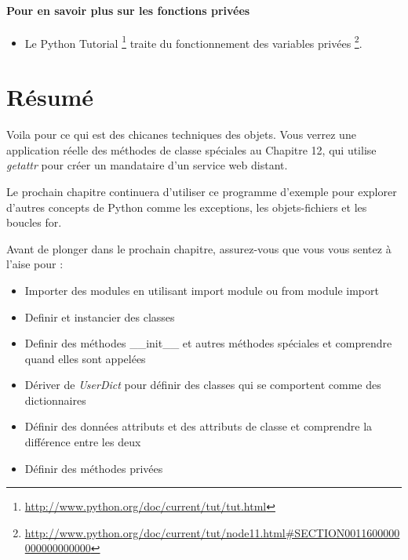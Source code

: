 \paragraph{Pour en savoir plus sur les fonctions privées}
\begin{itemize}
  \item Le Python Tutorial  \footnote{\url{http://www.python.org/doc/current/tut/tut.html}} traite du fonctionnement des variables privées  \footnote{\url{http://www.python.org/doc/current/tut/node11.html\#SECTION0011600000000000000000}}.
\end{itemize}

\section{Résumé}

Voila pour ce qui est des chicanes techniques des objets. Vous verrez une application réelle des méthodes de classe spéciales au Chapitre 12, qui utilise \emph{getattr} pour créer un mandataire d'un service web distant.

Le prochain chapitre continuera d'utiliser ce programme d'exemple pour explorer d'autres concepts de Python comme les exceptions, les objets-fichiers et les boucles for.

Avant de plonger dans le prochain chapitre, assurez-vous que vous vous sentez à l'aise pour :
\begin{itemize}
  \item Importer des modules en utilisant import module ou from module import
  \item Definir et instancier des classes
  \item Definir des méthodes \_\_init\_\_ et autres méthodes spéciales et comprendre quand elles sont appelées
  \item Dériver de \emph{UserDict} pour définir des classes qui se comportent comme des dictionnaires
  \item Définir des données attributs et des attributs de classe et comprendre la différence entre les deux
  \item Définir des méthodes privées
\end{itemize}